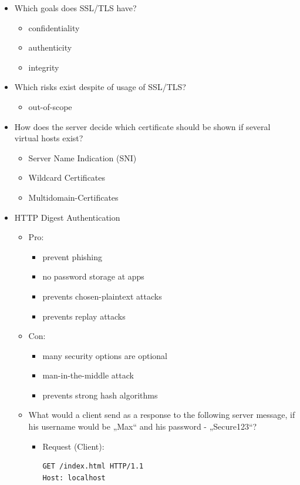 \documentclass[11pt]{article}
\begin{document}
\begin{itemize}
\item Which goals does SSL/TLS have?
\begin{itemize}
\item confidentiality
\item authenticity
\item integrity
\end{itemize}
\item Which risks exist despite of usage of SSL/TLS?
\begin{itemize}
\item out-of-scope
\end{itemize}
\item How does the server decide which certificate should be shown if several virtual hosts exist?
\begin{itemize}
\item Server Name Indication (SNI)
\item Wildcard Certificates
\item Multidomain-Certificates
\end{itemize}
\item HTTP Digest Authentication
\begin{itemize}
\item Pro:
\begin{itemize}
\item prevent phishing
\item no password storage at apps
\item prevents chosen-plaintext attacks
\item prevents replay attacks
\end{itemize}
\item Con:
\begin{itemize}
\item many security options are optional
\item man-in-the-middle attack
\item prevents strong hash algorithms
\end{itemize}
\item What would a client send as a response to the following server message, if his username would be „Max“ and his password - „Secure123“?
\begin{itemize}
\item Request (Client):
\lstset{breaklines=true,language=bash,label= ,caption= ,captionpos=b,numbers=none}
\begin{lstlisting}
GET /index.html HTTP/1.1
Host: localhost
\end{lstlisting}

\end{itemize}
\end{itemize}
\end{itemize}
\end{document}
